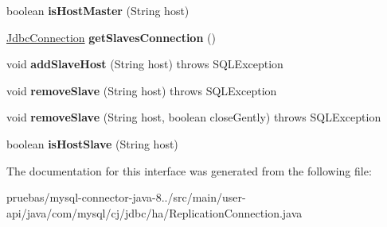 \begin{DoxyCompactItemize}
boolean {\bfseries is\+Host\+Master} (String host)
\item 
\mbox{\label{interfacecom_1_1mysql_1_1cj_1_1jdbc_1_1ha_1_1_replication_connection_aa5f54ad265b6462d4d2b13ae3b4cdc5c}} 
\mbox{\hyperlink{interfacecom_1_1mysql_1_1cj_1_1jdbc_1_1_jdbc_connection}{Jdbc\+Connection}} {\bfseries get\+Slaves\+Connection} ()
\item 
\mbox{\label{interfacecom_1_1mysql_1_1cj_1_1jdbc_1_1ha_1_1_replication_connection_ace5387750423fcebedca50789d44a26c}} 
void {\bfseries add\+Slave\+Host} (String host)  throws S\+Q\+L\+Exception
\item 
\mbox{\label{interfacecom_1_1mysql_1_1cj_1_1jdbc_1_1ha_1_1_replication_connection_a26c4c17241b8e9169e88484ba26bf081}} 
void {\bfseries remove\+Slave} (String host)  throws S\+Q\+L\+Exception
\item 
\mbox{\label{interfacecom_1_1mysql_1_1cj_1_1jdbc_1_1ha_1_1_replication_connection_ac4e3f61d87c2f40d760917c843b4a4aa}} 
void {\bfseries remove\+Slave} (String host, boolean close\+Gently)  throws S\+Q\+L\+Exception
\item 
\mbox{\label{interfacecom_1_1mysql_1_1cj_1_1jdbc_1_1ha_1_1_replication_connection_acd55ae42ba3c57522fc995a80da26675}} 
boolean {\bfseries is\+Host\+Slave} (String host)
\end{DoxyCompactItemize}


The documentation for this interface was generated from the following file\+:\begin{DoxyCompactItemize}
\item 
pruebas/mysql-\/connector-\/java-\/8../src/main/user-\/api/java/com/mysql/cj/jdbc/ha/Replication\+Connection.\+java\end{DoxyCompactItemize}

